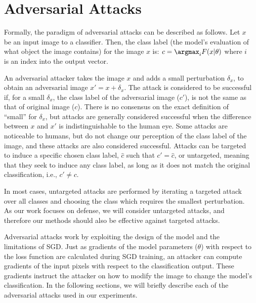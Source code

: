 \section{Adversarial Attacks} \label{attacks}
Formally, the paradigm of adversarial attacks can be described as follows. 
Let $x$ be an input image to a classifier. 
Then, the class label (the model's evaluation of what object the image contains) for the image $x$ is: $c = \argmax_{i} F(x|\theta)$ where $i$ is an index into the output vector.

An adversarial attacker takes the image $x$ and adds a small perturbation $\delta_x$, to obtain an adversarial image $x' = x + \delta_x$.
The attack is considered to be successful if, for a small $\delta_x$, the class label of the adversarial image ($c'$), is not the same as that of original image ($c$). 
There is no consensus on the exact definition of  ``small'' for $\delta_x$, but attacks are generally considered successful when the difference between $x$ and $x'$ is indistinguishable to the human eye. Some attacks are noticeable to humans, but do not change our perception of the class label of the image, and these attacks are also considered successful.  %
Attacks can be targeted to induce a specific chosen class label, $\hat{c}$ such that $c' = \hat{c}$, or untargeted, meaning that they seek to induce any class label, as long as it does not match the original classification, i.e., $c' \neq c$.

In most cases, untargeted attacks are performed by iterating a targeted attack over all classes and choosing the class which requires the smallest perturbation.
As our work focuses on defense, we will consider untargeted attacks, and therefore our methods should also be effective against targeted attacks.

Adversarial attacks work by exploiting the design of the model and the limitations of SGD. 
Just as gradients of the model parameters ($\theta$) with respect to the loss function are calculated during SGD training, an attacker can compute gradients of the input pixels with respect to the classification output.
These gradients instruct the attacker on how to modify the image to change the model's classification.
In the following sections, we will briefly describe each of the adversarial attacks used in our experiments.

